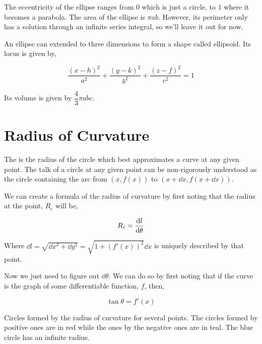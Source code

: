 The eccentricity of the ellipse ranges from \(0\) which is just a circle, to \(1\) where 
it becomes a parabola. The area of the ellipse is \(\pi ab\). However, its 
perimeter only has a solution through an infinite series integral, so we'll leave it 
out for now.

An ellipse can extended to three dimensions to form a shape called ellipsoid. Its locus is given by,

\begin{equation}
    \frac{(x-h)^2}{a^2} + \frac{(y-k)^2}{b^2} + \frac{(z-f)^2}{c^2} = 1
\end{equation}

Its volume is given by \(\dfrac{4}{3}\pi abc\).

\section{Radius of Curvature}

The  is the radius of the circle which best approximates 
a curve at any given point. The talk of a circle at any given point can be non-rigorously 
understood as the circle containing the arc from \((x, f(x))\) to \((x + \dd{x}, f(x + \dd{x}))\). 

We can create a formula of the radius of curvature by first noting that the 
radius at the point, \(R_c\) will be, 

\begin{equation*}
    R_c = \dv{l}{\theta}
\end{equation*}

Where \(\dd{l} = \sqrt{\dd{x}^2 + \dd{y}^2} = \sqrt{1 + (f'(x))^2} \dd{x}\) is uniquely described by that point. 

Now we just need to figure out \(\dd{\theta}\). We can do so by first noting that 
if the curve is the graph of some differentiable function, \(f\), then,

\begin{equation*}
    \tan \theta = f'(x)
\end{equation*}

\begin{marginfigure}
    \caption{Circles formed by the radius of curvature for several points. The circles
    formed by positive ones are in red while the ones by the negative ones are in teal. 
    The blue circle has an infinite radius.}
    \label{fig: roc}
\end{marginfigure}

